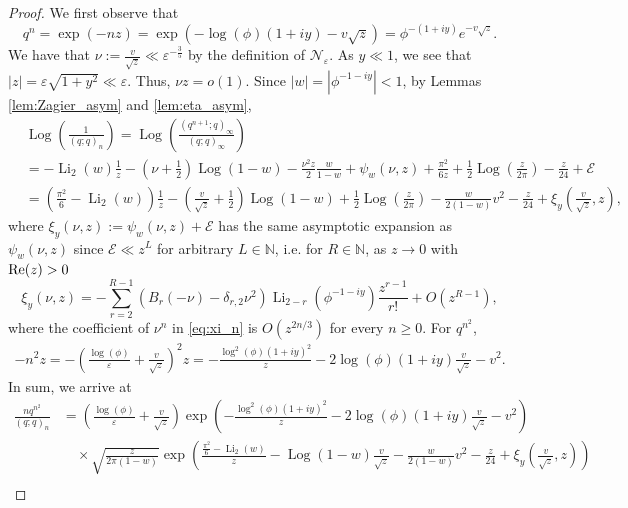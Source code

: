 \documentclass[11pt,reqno]{amsart}
\theoremstyle{remark}
\numberwithin{equation}{section}
\def\Log{\operatorname{Log}}
\def\Li{\operatorname{Li}}
\renewcommand{\Re}{{\rm Re}}
\renewcommand{\Re}{{\rm Re}}
\def\Log{\operatorname{Log}}
\def\Li{\operatorname{Li}}
\begin{document}
\begin{proof}
We first observe that
\[
	q^n = \exp \left( -n  z \right) = \exp \left( - \log(\phi) (1+i y) - v \sqrt{z}  \right) = \phi^{-(1+iy)}e^{-v \sqrt{z}}.
\]
We have that $\nu := \frac{v}{\sqrt{z}} \ll \varepsilon^{-\frac{3}{5}}$ by the definition of $\mathcal{N}_{\varepsilon}$.
As $y \ll 1$, we see that $|z| = \varepsilon \sqrt{1 + y^2} \ll \varepsilon$.
Thus, $\nu z = o(1)$.
Since $|w|=|\phi^{-1-iy}| <1$, by Lemmas \ref{lem:Zagier_asym} and \ref{lem:eta_asym},
\begin{align*}
	&\Log \left(\frac{1}{(q;q)_n}\right)=\Log \left(\frac{(q^{n+1};q)_\infty}{(q;q)_\infty} \right) \\
	&= - \Li_2 (w) \frac{1}{z} - \left( \nu + \frac{1}{2} \right) \Log(1-w) - \frac{\nu^2 z}{2} \frac{w}{1-w} + \psi_w (\nu, z) +\frac{\pi^{2}}{6z} + \frac{1}{2} \Log\left(\frac{z}{2\pi} \right) - \frac{z}{24} + \mathcal{E}\\
	&=\left( \frac{\pi^2}{6} - \Li_2 (w) \right) \frac{1}{z} - \left( \frac{v}{\sqrt{z}} + \frac{1}{2} \right) \Log(1-w) 
	 + \frac{1}{2} \Log\left(\frac{z}{2\pi} \right) - \frac{w}{2(1-w)}v^2 - \frac{z}{24} + \xi_y \left(\frac{v}{\sqrt{z}}, z\right), 
\end{align*}
where $\xi_y(\nu, z):= \psi_w (\nu, z)+\mathcal{E}$ has the same asymptotic expansion as $\psi_w(\nu, z)$ since $\mathcal{E}\ll z^L$ for arbitrary $L \in \mathbb{N}$, i.e. for $R \in \mathbb{N}$, as $z\to 0$ with $\Re(z)>0$
\[
	\xi_y(\nu, z) = -\sum_{r=2}^{R-1} \left( B_r(-\nu)-\delta_{r,2} \nu^2 \right) \Li_{2-r}(\phi^{-1-iy}) \frac{z^{r-1}}{r!} + O\left( z^{R-1} \right),
\]
where the coefficient of $\nu^n$ in \eqref{eq:xi_n} is $O\left(z^{2n/3} \right)$ for every $n \geq 0$. For $q^{n^2}$,
\begin{align*}
	-n^2 z = - \left( \frac{\log (\phi)}{\varepsilon} + \frac{v}{\sqrt{z}} \right)^2 z = - \frac{\log^2 (\phi) (1+ iy)^2}{z} - 2  \log(\phi) (1+iy) \frac{v}{\sqrt{z}} - v^2. 	
\end{align*}
In sum, we arrive at 
\begin{align*}
	\frac{n q^{n^2}}{(q;q)_n} 
	&= \left( \frac{\log (\phi)}{\varepsilon} + \frac{v}{\sqrt{z}} \right) \exp\left( - \frac{\log^2 (\phi) (1+ iy)^2}{z} - 2  \log(\phi) (1+iy) \frac{v}{\sqrt{z}} - v^2 \right)\\
	&\quad \times \sqrt{\frac{z}{2\pi(1-w)}} \exp\left( \frac{ \frac{\pi^2}{6} - \Li_2 (w)}{z} - \Log(1-w)\frac{v}{\sqrt{z}}   - \frac{w}{2(1-w)}v^2 - \frac{z}{24} + \xi_y \left(\frac{v}{\sqrt{z}}, z\right) \right)\\

\end{align*}
\end{proof}
\end{document}
